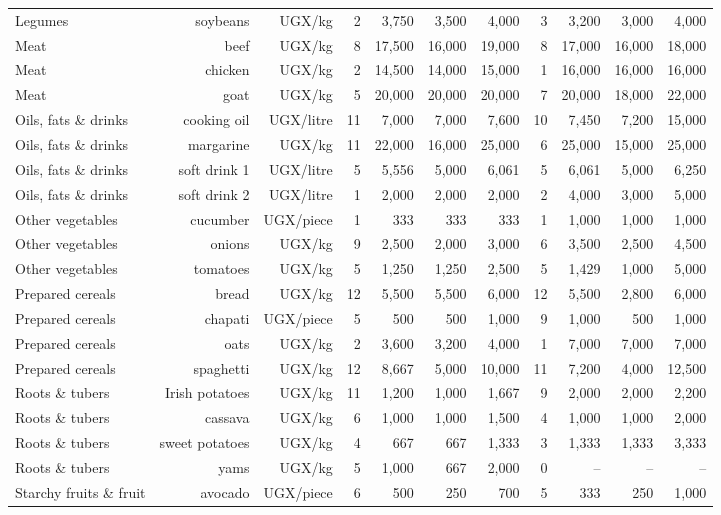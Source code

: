 \begin{table}[htbp]
\begin{tabular}{lrrrrrrrrrr}
Legumes & soybeans & UGX/kg & 2 & 3,750 & 3,500 & 4,000 & 3 & 3,200 & 3,000 & 4,000 \\
Meat & beef & UGX/kg & 8 & 17,500 & 16,000 & 19,000 & 8 & 17,000 & 16,000 & 18,000 \\
Meat & chicken & UGX/kg & 2 & 14,500 & 14,000 & 15,000 & 1 & 16,000 & 16,000 & 16,000 \\
Meat & goat & UGX/kg & 5 & 20,000 & 20,000 & 20,000 & 7 & 20,000 & 18,000 & 22,000 \\
Oils, fats \& drinks & cooking oil & UGX/litre & 11 & 7,000 & 7,000 & 7,600 & 10 & 7,450 & 7,200 & 15,000 \\
Oils, fats \& drinks & margarine & UGX/kg & 11 & 22,000 & 16,000 & 25,000 & 6 & 25,000 & 15,000 & 25,000 \\
Oils, fats \& drinks & soft drink 1 & UGX/litre & 5 & 5,556 & 5,000 & 6,061 & 5 & 6,061 & 5,000 & 6,250 \\
Oils, fats \& drinks & soft drink 2 & UGX/litre & 1 & 2,000 & 2,000 & 2,000 & 2 & 4,000 & 3,000 & 5,000 \\
Other vegetables & cucumber & UGX/piece & 1 & 333 & 333 & 333 & 1 & 1,000 & 1,000 & 1,000 \\
Other vegetables & onions & UGX/kg & 9 & 2,500 & 2,000 & 3,000 & 6 & 3,500 & 2,500 & 4,500 \\
Other vegetables & tomatoes & UGX/kg & 5 & 1,250 & 1,250 & 2,500 & 5 & 1,429 & 1,000 & 5,000 \\
Prepared cereals & bread & UGX/kg & 12 & 5,500 & 5,500 & 6,000 & 12 & 5,500 & 2,800 & 6,000 \\
Prepared cereals & chapati & UGX/piece & 5 & 500 & 500 & 1,000 & 9 & 1,000 & 500 & 1,000 \\
Prepared cereals & oats & UGX/kg & 2 & 3,600 & 3,200 & 4,000 & 1 & 7,000 & 7,000 & 7,000 \\
Prepared cereals & spaghetti & UGX/kg & 12 & 8,667 & 5,000 & 10,000 & 11 & 7,200 & 4,000 & 12,500 \\
Roots \& tubers & Irish potatoes & UGX/kg & 11 & 1,200 & 1,000 & 1,667 & 9 & 2,000 & 2,000 & 2,200 \\
Roots \& tubers & cassava & UGX/kg & 6 & 1,000 & 1,000 & 1,500 & 4 & 1,000 & 1,000 & 2,000 \\
Roots \& tubers & sweet potatoes & UGX/kg & 4 & 667 & 667 & 1,333 & 3 & 1,333 & 1,333 & 3,333 \\
Roots \& tubers & yams & UGX/kg & 5 & 1,000 & 667 & 2,000 & 0 & -- & -- & -- \\
Starchy fruits \& fruit & avocado & UGX/piece & 6 & 500 & 250 & 700 & 5 & 333 & 250 & 1,000 \\

\end{tabular}
\end{table}
